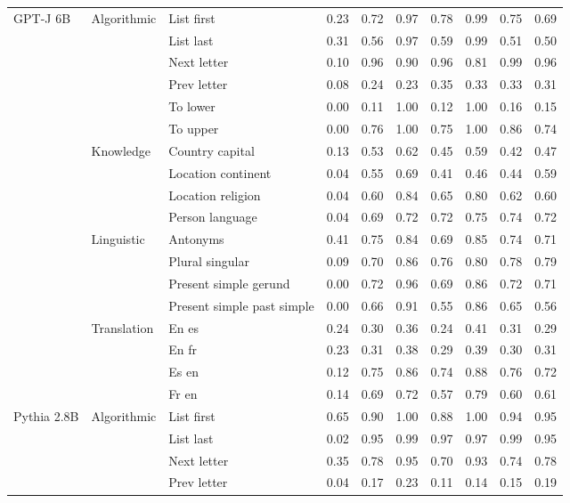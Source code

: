 \begin{center}
\begin{longtable}{lllrrrrrrr}
\multirow[t]{18}{*}{GPT-J 6B} & \multirow[t]{6}{*}{Algorithmic} & List first & 0.23 & 0.72 & 0.97 & 0.78 & 0.99 & 0.75 & 0.69 \\
 &  & List last & 0.31 & 0.56 & 0.97 & 0.59 & 0.99 & 0.51 & 0.50 \\
 &  & Next letter & 0.10 & 0.96 & 0.90 & 0.96 & 0.81 & 0.99 & 0.96 \\
 &  & Prev letter & 0.08 & 0.24 & 0.23 & 0.35 & 0.33 & 0.33 & 0.31 \\
 &  & To lower & 0.00 & 0.11 & 1.00 & 0.12 & 1.00 & 0.16 & 0.15 \\
 &  & To upper & 0.00 & 0.76 & 1.00 & 0.75 & 1.00 & 0.86 & 0.74 \\
\cline{2-10}
 & \multirow[t]{4}{*}{Knowledge} & Country capital & 0.13 & 0.53 & 0.62 & 0.45 & 0.59 & 0.42 & 0.47 \\
 &  & Location continent & 0.04 & 0.55 & 0.69 & 0.41 & 0.46 & 0.44 & 0.59 \\
 &  & Location religion & 0.04 & 0.60 & 0.84 & 0.65 & 0.80 & 0.62 & 0.60 \\
 &  & Person language & 0.04 & 0.69 & 0.72 & 0.72 & 0.75 & 0.74 & 0.72 \\
\cline{2-10}
 & \multirow[t]{4}{*}{Linguistic} & Antonyms & 0.41 & 0.75 & 0.84 & 0.69 & 0.85 & 0.74 & 0.71 \\
 &  & Plural singular & 0.09 & 0.70 & 0.86 & 0.76 & 0.80 & 0.78 & 0.79 \\
 &  & Present simple gerund & 0.00 & 0.72 & 0.96 & 0.69 & 0.86 & 0.72 & 0.71 \\
 &  & Present simple past simple & 0.00 & 0.66 & 0.91 & 0.55 & 0.86 & 0.65 & 0.56 \\
\cline{2-10}
 & \multirow[t]{4}{*}{Translation} & En es & 0.24 & 0.30 & 0.36 & 0.24 & 0.41 & 0.31 & 0.29 \\
 &  & En fr & 0.23 & 0.31 & 0.38 & 0.29 & 0.39 & 0.30 & 0.31 \\
 &  & Es en & 0.12 & 0.75 & 0.86 & 0.74 & 0.88 & 0.76 & 0.72 \\
 &  & Fr en & 0.14 & 0.69 & 0.72 & 0.57 & 0.79 & 0.60 & 0.61 \\
\cline{1-10} \cline{2-10}
\multirow[t]{18}{*}{Pythia 2.8B} & \multirow[t]{6}{*}{Algorithmic} & List first & 0.65 & 0.90 & 1.00 & 0.88 & 1.00 & 0.94 & 0.95 \\
 &  & List last & 0.02 & 0.95 & 0.99 & 0.97 & 0.97 & 0.99 & 0.95 \\
 &  & Next letter & 0.35 & 0.78 & 0.95 & 0.70 & 0.93 & 0.74 & 0.78 \\
 &  & Prev letter & 0.04 & 0.17 & 0.23 & 0.11 & 0.14 & 0.15 & 0.19 \\

\end{longtable}
\end{center}
